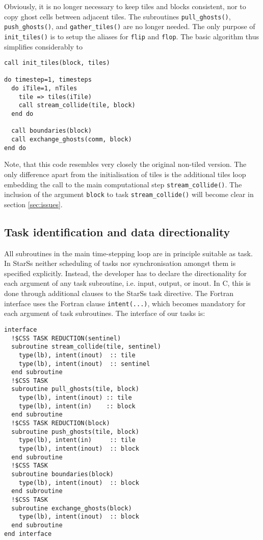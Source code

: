 \documentclass[conference]{IEEEtran}
\newcommand{\starss}{{StarSs}}
\begin{document}
Obviously, it is no longer necessary to keep tiles and blocks
consistent, nor to copy ghost cells between adjacent tiles. The
subroutines \verb!pull_ghosts()!, \verb!push_ghosts()!, and
\verb!gather_tiles()! are no longer needed. The only purpose of
\verb!init_tiles()! is to setup the aliases for \verb!flip! and
\verb!flop!. The basic algorithm thus simplifies considerably to
\begin{lstlisting}
call init_tiles(block, tiles)

do timestep=1, timesteps
  do iTile=1, nTiles
    tile => tiles(iTile)
    call stream_collide(tile, block)
  end do

  call boundaries(block)
  call exchange_ghosts(comm, block)
end do
\end{lstlisting}
Note, that this code resembles very closely the original non-tiled
version. The only difference apart from the initialisation of tiles is
the additional tiles loop embedding the call to the main computational
step \verb!stream_collide()!. The inclusion of the argument
\verb!block! to task \verb!stream_collide()! will become clear in
section \ref{sec:issues}.

\subsection{Task identification and data directionality}
\label{sec:tasks}

All subroutines in the main time-stepping loop are in principle suitable as
task. In \starss{} neither scheduling of tasks nor synchronisation amongst
them is specified explicitly. Instead, the developer has to declare the
directionality for each argument of any task subroutine, i.e. input, output,
or inout. In C, this is done through additional clauses to the \starss{} task
directive. The Fortran interface uses the Fortran clause \verb!intent(...)!,
which becomes mandatory for each argument of task subroutines. The interface
of our tasks is:

\begin{lstlisting}
interface
  !$CSS TASK REDUCTION(sentinel)
  subroutine stream_collide(tile, sentinel)
    type(lb), intent(inout)  :: tile
    type(lb), intent(inout)  :: sentinel
  end subroutine
  !$CSS TASK
  subroutine pull_ghosts(tile, block)
    type(lb), intent(inout) :: tile
    type(lb), intent(in)    :: block
  end subroutine
  !$CSS TASK REDUCTION(block)
  subroutine push_ghosts(tile, block)
    type(lb), intent(in)     :: tile
    type(lb), intent(inout)  :: block
  end subroutine
  !$CSS TASK
  subroutine boundaries(block)
    type(lb), intent(inout)  :: block
  end subroutine
  !$CSS TASK
  subroutine exchange_ghosts(block)
    type(lb), intent(inout)  :: block
  end subroutine
end interface
\end{lstlisting}
\end{document}
